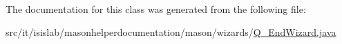 The documentation for this class was generated from the following file\-:\begin{DoxyCompactItemize}
\item 
src/it/isislab/masonhelperdocumentation/mason/wizards/\hyperlink{_q___end_wizard_8java}{Q\-\_\-\-End\-Wizard.\-java}\end{DoxyCompactItemize}
